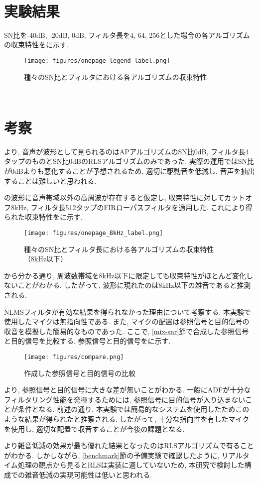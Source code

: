 \
\section{実験結果}\label{result-practice}

SN比を-40dB, -20dB, 0dB, フィルタ長を4, 64, 256とした場合の各アルゴリズムの収束特性をに示す. 
\begin{figure}[H]
\centering
\texttt{[image: figures/onepage\_legend\_label.png]}
\caption{種々のSN比とフィルタにおける各アルゴリズムの収束特性}
\label{fig:onepage}
\end{figure}

\
\section{考察}\label{consideration-practice}

より, 音声が波形として見られるのはAPアルゴリズムのSN比0dB, フィルタ長4タップのものとSN比0dBのRLSアルゴリズムのみであった. 実際の運用ではSN比が0dBよりも悪化することが予想されるため, 適切に駆動音を低減し, 音声を抽出することは難しいと思われる. 

\figref{fig:onepage}の波形に音声帯域以外の高周波が存在すると仮定し, 収束特性に対してカットオフ8kHz, フィルタ長512タップのFIRローパスフィルタを適用した. これにより得られた収束特性を\figref{fig:onepage_8kHz}に示す. 

\begin{figure}[H]
\centering
\texttt{[image: figures/onepage\_8kHz\_label.png]}
\caption{種々のSN比とフィルタ長における各アルゴリズムの収束特性（8kHz以下）}
\label{fig:onepage_8kHz}
\end{figure}

から分かる通り, 周波数帯域を8kHz以下に限定しても収束特性がほとんど変化しないことがわかる. したがって, 波形に現れたのは8kHz以下の雑音であると推測される. 

NLMSフィルタが有効な結果を得られなかった理由について考察する. 本実験で使用したマイクは無指向性である. また, マイクの配置は参照信号と目的信号の収音を模擬した簡易的なものであった. ここで, \ref{mix-snr}節で合成した参照信号と目的信号を比較する. 参照信号と目的信号をに示す. 

\begin{figure}[H]
\centering
\texttt{[image: figures/compare.png]}
\caption{作成した参照信号と目的信号の比較}
\label{fig:compare_x_d}
\end{figure}

より, 参照信号と目的信号に大きな差が無いことがわかる. 一般にADFが十分なフィルタリング性能を発揮するためには, 参照信号に目的信号が入り込まないことが条件となる. 前述の通り, 本実験では簡易的なシステムを使用したためこのような結果が得られたと推察される. したがって, 十分な指向性を有したマイクを使用し, 適切な配置で収音することが今後の課題となる. 

\figref{fig:onepage}より雑音低減の効果が最も優れた結果となったのはRLSアルゴリズムで有ることがわかる. しかしながら, \ref{benchmark}節の予備実験で確認したように, リアルタイム処理の観点から見るとRLSは実装に適していないため, 本研究で検討した構成での雑音低減の実現可能性は低いと思われる. 
